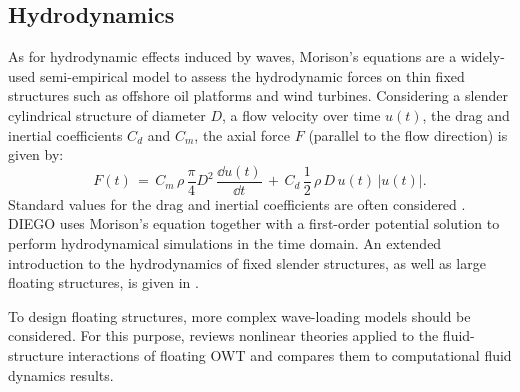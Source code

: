 

\subsection{Hydrodynamics}

As for hydrodynamic effects induced by waves, Morison's equations are a widely-used semi-empirical model to assess the hydrodynamic forces on thin fixed structures such as offshore oil platforms and wind turbines. 
Considering a slender cylindrical structure of diameter $D$, a flow velocity over time $u(t)$, the drag and inertial coefficients $C_d$ and $C_m$, the axial force $F$ (parallel to the flow direction) is given by:   
\begin{equation}
    F(t)\,=\,C_{m}\,\rho \,{\frac {\pi }{4}}D^{2}\,{\frac{\dd u(t)}{\dd t}}\,+\,C_{d}\,{\frac 12}\,\rho \,D\,u(t)\,|u(t)|.
\end{equation}
Standard values for the drag and inertial coefficients are often considered \citep{dnv_2013_offshore_design}. 
DIEGO uses Morison's equation together with a first-order potential solution to perform hydrodynamical simulations in the time domain.
An extended introduction to the hydrodynamics of fixed slender structures, as well as large floating structures, is given in \citep[Chap. 1]{milano_thesis_2021}.  

To design floating structures, more complex wave-loading models should be considered. 
For this purpose, \citet{ronge_2023_hydrodynamics_fowt} reviews nonlinear theories applied to the fluid-structure interactions of floating OWT and compares them to computational fluid dynamics results. 


